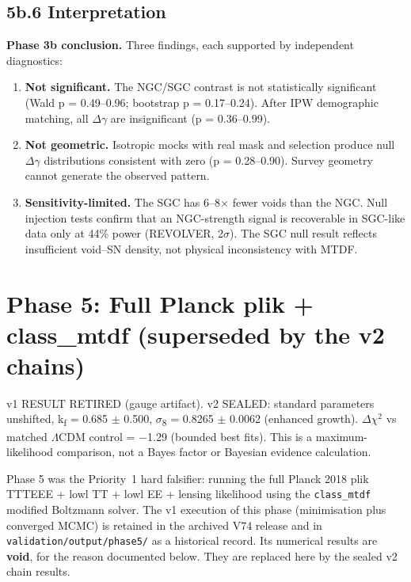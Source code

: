 \documentclass[11pt,a4paper]{article}
\begin{document}
\subsection{5b.6 Interpretation}
\begin{mdframed}[linecolor=accent,linewidth=0.5pt,backgroundcolor=callout-bg,leftline=true,rightline=true,topline=true,bottomline=true,innerleftmargin=8pt,innerrightmargin=8pt,innertopmargin=6pt,innerbottommargin=6pt]
\textbf{Phase 3b conclusion.}
Three findings, each supported by independent diagnostics:
\begin{enumerate}
  \item \textbf{Not significant.} The NGC/\allowbreak{}SGC contrast is not statistically significant (Wald p = 0.49--0.96; bootstrap p = 0.17--0.24). After IPW demographic matching, all $\Delta$$\gamma$ are insignificant (p = 0.36--0.99).
  \item \textbf{Not geometric.} Isotropic mocks with real mask and selection produce null $\Delta$$\gamma$ distributions consistent with zero (p = 0.28--0.90). Survey geometry cannot generate the observed pattern.
  \item \textbf{Sensitivity-limited.} The SGC has 6--8$\times$ fewer voids than the NGC. Null injection tests confirm that an NGC-strength signal is recoverable in SGC-like data only at 44\% power (REVOLVER, 2$\sigma$). The SGC null result reflects insufficient void--SN density, not physical inconsistency with MTDF.
\end{enumerate}
\end{mdframed}

\section[Phase 5: Full Planck plik + class\_mtdf (v1 retired; sealed v2)]{Phase 5: Full Planck plik + class\_\allowbreak{}mtdf (superseded by the v2 chains)}
\label{sec:sec6}
v1 RESULT RETIRED (gauge artifact). v2 SEALED: standard parameters unshifted, k\textsubscript{f} = 0.685 $\pm$ 0.500, $\sigma$\textsubscript{8} = 0.8265 $\pm$ 0.0062 (enhanced growth). $\Delta$$\chi$$^{2}$ vs matched $\Lambda$CDM control = $-$1.29 (bounded best fits). This is a maximum-likelihood comparison, not a Bayes factor or Bayesian evidence calculation.

Phase 5 was the Priority~1 hard falsifier: running the full Planck 2018 plik TTTEEE + lowl TT + lowl EE + lensing likelihood using the \texttt{class\_\allowbreak{}mtdf} modified Boltzmann solver. The v1 execution of this phase (minimisation plus converged MCMC) is retained in the archived V74 release and in \texttt{validation/\allowbreak{}output/\allowbreak{}phase5/\allowbreak{}} as a historical record. Its numerical results are \textbf{void}, for the reason documented below. They are replaced here by the sealed v2 chain results.
\end{document}
